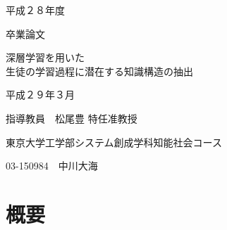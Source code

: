 \documentclass[a4j,12pt]{jreport}
\begin{document}
\begin{center}
\vspace*{1.6cm}
\Large 平成２８年度

\vspace*{0.4cm}
\Large 卒業論文

\vspace*{1.6cm}

\LARGE 深層学習を用いた\\生徒の学習過程に潜在する知識構造の抽出
\vspace{6.4cm}

\Large 平成２９年３月

\vspace{0.2cm}
\Large 指導教員　松尾豊 特任准教授

\vspace{0.6cm}
\Large 東京大学工学部システム創成学科知能社会コース

\vspace{0.2cm}
\Large 03-150984　中川大海


\end{center}
\normalsize
\thispagestyle{empty}
\clearpage

\chapter*{概要}

\renewcommand{\baselinestretch}{1.3} 



\newpage
{}
\tableofcontents
\newpage
\listoffigures
\newpage
\listoftables
\newpage


\pagestyle{fancy}










\newpage
{}
\label{chap:reference}
\fancyhf{}
\rhead{\thepage}
\cfoot{\thepage}

%





\appendix
{}

\newpage
{}

\end{document}
